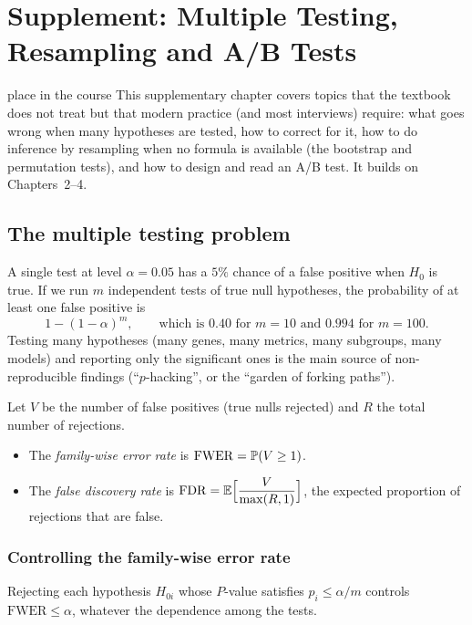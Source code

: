 \chapter{Supplement: Multiple Testing, Resampling and A/B Tests}

\begin{nuance}{place in the course}
This supplementary chapter covers topics that the textbook does not treat but that modern practice (and most interviews) require: what goes wrong when many hypotheses are tested, how to correct for it, how to do inference by resampling when no formula is available (the bootstrap and permutation tests), and how to design and read an A/B test. It builds on Chapters~2--4.
\end{nuance}

\section{The multiple testing problem}

A single test at level $\alpha=0.05$ has a $5\%$ chance of a false positive when $H_0$ is true. If we run $m$ independent tests of true null hypotheses, the probability of at least one false positive is
\[ 1-(1-\alpha)^m,\qquad\text{which is }0.40\text{ for }m=10\text{ and }0.994\text{ for }m=100. \]
Testing many hypotheses (many genes, many metrics, many subgroups, many models) and reporting only the significant ones is the main source of non-reproducible findings (``$p$-hacking'', or the ``garden of forking paths'').

\begin{definition}
Let $V$ be the number of false positives (true nulls rejected) and $R$ the total number of rejections.
\begin{itemize}
  \item The \emph{family-wise error rate} is $\mathrm{FWER}=\mathbb{P}(V\ge1)$.
  \item The \emph{false discovery rate} is $\mathrm{FDR}=\mathbb{E}\Big[\dfrac V{\max(R,1)}\Big]$, the expected proportion of rejections that are false.
\end{itemize}
\end{definition}

\subsection{Controlling the family-wise error rate}

\begin{theorem}\label{thm:bonf}
Rejecting each hypothesis $H_{0i}$ whose $P$-value satisfies $p_i\le\alpha/m$ controls $\mathrm{FWER}\le\alpha$, whatever the dependence among the tests.
\end{theorem}

